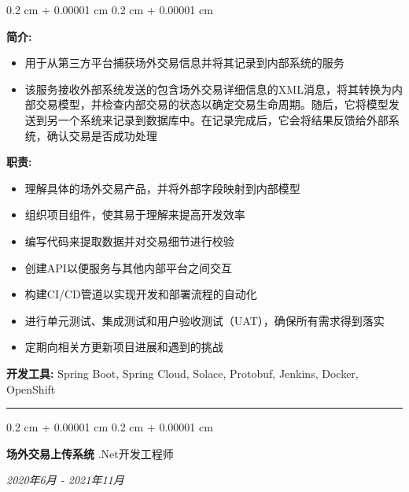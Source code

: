 \documentclass[10pt, letterpaper]{article}
\newenvironment{highlights}{
	\begin{itemize}[
		topsep=0.10 cm,
		parsep=0.10 cm,
		partopsep=0pt,
		itemsep=0pt,
		leftmargin=0.4 cm + 10pt
		]
	}{
	\end{itemize}
} %
\newenvironment{onecolentry}{
	\begin{adjustwidth}{
			0.2 cm + 0.00001 cm
		}{
			0.2 cm + 0.00001 cm
		}
	}{
	\end{adjustwidth}
} %
\newenvironment{twocolentry}[2][]{
	\onecolentry
	\def\secondColumn{#2}
	\setcolumnwidth{\fill, 4.5 cm}
	\begin{paracol}{2}
	}{
		\switchcolumn \raggedleft \secondColumn
	\end{paracol}
	\endonecolentry
} %
\begin{document}
			\vspace{0.10 cm}
			\begin{onecolentry}
				\textbf{简介:} 
				\begin{highlights}
					\item{用于从第三方平台捕获场外交易信息并将其记录到内部系统的服务}
					\item{该服务接收外部系统发送的包含场外交易详细信息的XML消息，将其转换为内部交易模型，并检查内部交易的状态以确定交易生命周期。随后，它将模型发送到另一个系统来记录到数据库中。在记录完成后，它会将结果反馈给外部系统，确认交易是否成功处理}
				\end{highlights}
				\textbf{职责:} 
				\begin{highlights}
					\item{理解具体的场外交易产品，并将外部字段映射到内部模型}
					\item{组织项目组件，使其易于理解来提高开发效率}
					\item{编写代码来提取数据并对交易细节进行校验}
					\item{创建API以便服务与其他内部平台之间交互}
					\item{构建CI/CD管道以实现开发和部署流程的自动化}
					\item{进行单元测试、集成测试和用户验收测试（UAT），确保所有需求得到落实}
					\item{定期向相关方更新项目进展和遇到的挑战}
				\end{highlights}
				\textbf{开发工具:} Spring Boot, Spring Cloud, Solace, Protobuf, Jenkins, Docker, OpenShift
			\end{onecolentry}
			\vspace{0.4 cm}
			\hrule
			\vspace{0.4 cm}
			\begin{twocolentry}{	
				\textit{2020年6月 - 2021年11月}}
				\textbf{场外交易上传系统}
				\space\space\space\space\space\space\space\space\space\space\space\space .Net开发工程师
			\end{twocolentry}
			
\end{document}
